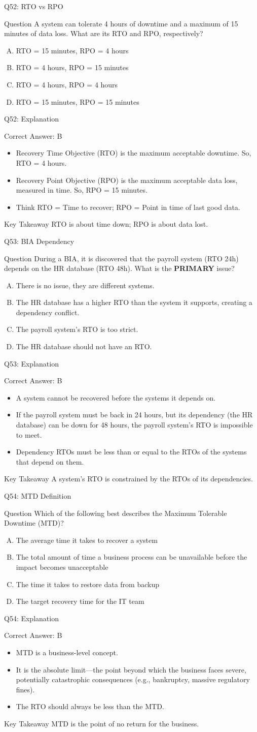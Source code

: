 \documentclass[aspectratio=169]{beamer}
\newcommand{\hq}[7]{%
	\begin{frame}{Q#1: #2}
		\begin{block}{Question}
			#3
		\end{block}
		\begin{enumerate}[(A)]
			#4
		\end{enumerate}
	\end{frame}
	\begin{frame}{Q#1: Explanation}
		\begin{block}{Correct Answer: #5}
			\begin{itemize}
				#6
			\end{itemize}
		\end{block}
		\begin{alertblock}{Key Takeaway}
			#7
		\end{alertblock}
	\end{frame}
}
\begin{document}
	\hq{52}{RTO vs RPO}
	{A system can tolerate 4 hours of downtime and a maximum of 15 minutes of data loss. What are its RTO and RPO, respectively?}
	{\item RTO = 15 minutes, RPO = 4 hours
		\item RTO = 4 hours, RPO = 15 minutes
		\item RTO = 4 hours, RPO = 4 hours
		\item RTO = 15 minutes, RPO = 15 minutes}
	{B}
	{\item Recovery Time Objective (RTO) is the maximum acceptable downtime. So, RTO = 4 hours.
		\item Recovery Point Objective (RPO) is the maximum acceptable data loss, measured in time. So, RPO = 15 minutes.
		\item Think RTO = Time to recover; RPO = Point in time of last good data.}
	{RTO is about time down; RPO is about data lost.}
	
	\hq{53}{BIA Dependency}
	{During a BIA, it is discovered that the payroll system (RTO 24h) depends on the HR database (RTO 48h). What is the \textbf{PRIMARY} issue?}
	{\item There is no issue, they are different systems.
		\item The HR database has a higher RTO than the system it supports, creating a dependency conflict.
		\item The payroll system's RTO is too strict.
		\item The HR database should not have an RTO.}
	{B}
	{\item A system cannot be recovered before the systems it depends on.
		\item If the payroll system must be back in 24 hours, but its dependency (the HR database) can be down for 48 hours, the payroll system's RTO is impossible to meet.
		\item Dependency RTOs must be less than or equal to the RTOs of the systems that depend on them.}
	{A system's RTO is constrained by the RTOs of its dependencies.}
	
	\hq{54}{MTD Definition}
	{Which of the following best describes the Maximum Tolerable Downtime (MTD)?}
	{\item The average time it takes to recover a system
		\item The total amount of time a business process can be unavailable before the impact becomes unacceptable
		\item The time it takes to restore data from backup
		\item The target recovery time for the IT team}
	{B}
	{\item MTD is a business-level concept.
		\item It is the absolute limit—the point beyond which the business faces severe, potentially catastrophic consequences (e.g., bankruptcy, massive regulatory fines).
		\item The RTO should always be less than the MTD.}
	{MTD is the point of no return for the business.}
	
\end{document}
